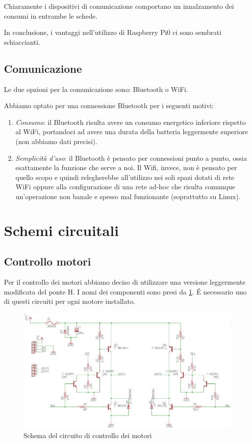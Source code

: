 \documentclass[12pt]{article}
\begin{document}
Chiaramente i dispositivi di comunicazione comportano un innalzamento dei consumi in entrambe le schede.

In conclusione, i vantaggi nell'utilizzo di Raspberry Pi0 ci sono sembrati schiaccianti.

\subsection{Comunicazione}
Le due opzioni per la comunicazione sono: Bluetooth o WiFi.

Abbiamo optato per una connessione Bluetooth per i seguenti motivi:
\begin{enumerate}
\item \emph{Consumo}: il Bluetooth risulta avere un consumo energetico inferiore rispetto al WiFi, portandoci ad avere una durata della batteria leggermente superiore (non abbiamo dati precisi).
\item \emph{Semplicità d'uso}: il Bluetooth è pensato per connessioni punto a punto, ossia esattamente la funzione che serve a noi. Il Wifi, invece, non è pensato per quello scopo e quindi relegherebbe all'utilizzo nei soli spazi dotati di rete WiFi oppure alla configurazione di una rete ad-hoc che risulta comunque un'operazione non banale e spesso mal funzionante (soprattutto su Linux).
\end{enumerate}

\section{Schemi circuitali}
\subsection{Controllo motori}
Per il controllo dei motori abbiamo deciso di utilizzare una versione leggermente modificata del ponte H. I nomi dei componenti sono presi da \cref{fig:ponteH}. \'E necessario uno di questi circuiti per ogni motore installato.

\begin{figure}[h]
\includegraphics[width=\textwidth]{SchemaH}
\centering
\caption{Schema del circuito di controllo dei motori}
\label{fig:ponteH}
\end{figure}
\end{document}
